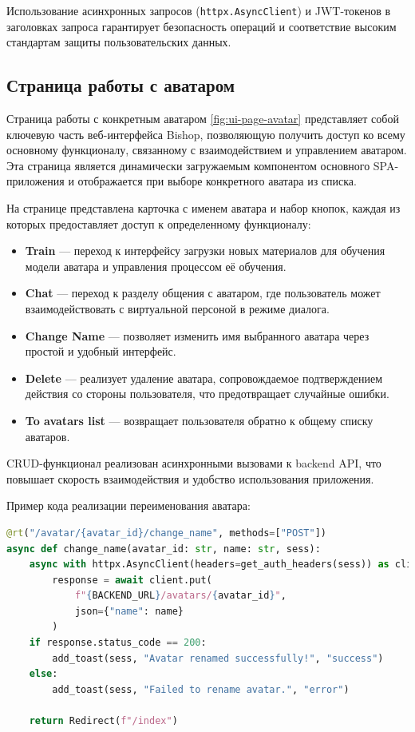 Использование асинхронных запросов (\texttt{httpx.AsyncClient}) и JWT-токенов в заголовках запроса 
гарантирует безопасность операций и соответствие высоким стандартам защиты пользовательских данных.

\subsection{Страница работы с аватаром}
Страница работы с конкретным аватаром \ref{fig:ui-page-avatar} представляет собой ключевую часть веб-интерфейса Bishop, 
позволяющую получить доступ ко всему основному функционалу, связанному с взаимодействием и 
управлением аватаром. Эта страница является динамически загружаемым компонентом основного 
SPA-приложения и отображается при выборе конкретного аватара из списка.


На странице представлена карточка с именем аватара и набор кнопок, каждая из которых предоставляет 
доступ к определенному функционалу:

\begin{itemize}
  \item \textbf{Train} — переход к интерфейсу загрузки новых материалов для обучения модели аватара 
        и управления процессом её обучения.
  \item \textbf{Chat} — переход к разделу общения с аватаром, где пользователь может взаимодействовать 
        с виртуальной персоной в режиме диалога.
  \item \textbf{Change Name} — позволяет изменить имя выбранного аватара через простой и удобный интерфейс.
  \item \textbf{Delete} — реализует удаление аватара, сопровождаемое подтверждением действия со стороны 
        пользователя, что предотвращает случайные ошибки.
  \item \textbf{To avatars list} — возвращает пользователя обратно к общему списку аватаров.
\end{itemize}


CRUD-функционал реализован асинхронными вызовами к backend API, 
что повышает скорость взаимодействия и удобство использования приложения.


Пример кода реализации переименования аватара:

\begin{lstlisting}[language=Python, numbers=none, frame=none]
@rt("/avatar/{avatar_id}/change_name", methods=["POST"])
async def change_name(avatar_id: str, name: str, sess):
    async with httpx.AsyncClient(headers=get_auth_headers(sess)) as client:
        response = await client.put(
            f"{BACKEND_URL}/avatars/{avatar_id}",
            json={"name": name}
        )
    if response.status_code == 200:
        add_toast(sess, "Avatar renamed successfully!", "success")
    else:
        add_toast(sess, "Failed to rename avatar.", "error")

    return Redirect(f"/index")
\end{lstlisting}


